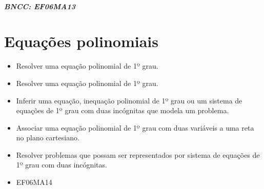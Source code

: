 \paragraph{BNCC: EF06MA13 }


\chapter{Equações polinomiais}

\begin{itemize}
\item Resolver uma equação polinomial de 1º grau.
\item
 Resolver uma equação polinomial de 1º grau.
\item
  Inferir uma equação, inequação polinomial de 1º grau ou um sistema de
  equações de 1º grau com duas incógnitas que modela um problema.
\item
  Associar uma equação polinomial de 1º grau com duas variáveis a uma
  reta no plano cartesiano.
\item
  Resolver problemas que possam ser representados por sistema de
  equações de 1º grau com duas incógnitas.
\end{itemize}

\begin{itemize} 
\item  EF06MA14
\end{itemize}


